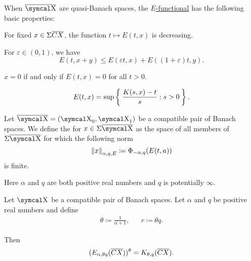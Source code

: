 \begin{proposition}\label{thm:e_functional_properties}
  When \( \Ol{\CX} \) are quasi-Banach spaces, the \hyperref[def:e_functional]{\( E \)-functional} has the following basic properties:

  \begin{PropEnum}
     For fixed \( x \in \Sigma\overline{CX} \), the function \( t \mapsto E(t, x) \) is decreasing.

     For \( \varepsilon \in (0, 1) \), we have
    \begin{equation*}
      E(t, x + y) \leq E(\varepsilon t, x) + E((1 + \varepsilon) t, y).
    \end{equation*}

     \( x = 0 \) if and only if \( E(t, x) = 0 \) for all \( t > 0 \).

    \begin{equation*}
      E(t, x) = \sup \Set{ \frac {K(s, x) - t} s : s > 0 }.
    \end{equation*}
  \end{PropEnum}
\end{proposition}

\begin{definition}\label{def:approximation_space}
  Let \( \Ol{\CX} = (\CX_0, \CX_1) \) be a compatible pair of Banach spaces. We define the  for \( x \in \Sigma\Ol{\CX} \) as the space of all members of \( \Sigma\Ol{\CX} \) for which the following norm
  \begin{equation}\label{eq:def:approximation_space/norm}
    \left\Vert x \right\Vert_{\alpha,q,E} \coloneqq \Phi_{-\alpha,q}(E(t,a))
  \end{equation}
  is finite.

  Here \( \alpha \) and \( q \) are both positive real numbers and \( q \) is potentially \( \infty \).
\end{definition}

\begin{theorem}\label{thm:interpolation_space_and_approximation_space}
  Let \( \CX \) be a compatible pair of Banach spaces. Let \( \alpha \) and \( q \) be positive real numbers and define
  \begin{align*}
    \theta \coloneqq \frac 1 {\alpha + 1},
    &&
    r \coloneqq \theta q.
  \end{align*}

  Then
  \begin{equation*}
    (E_{\alpha,\theta q}(\overline{CX}))^\theta = K_{\theta,q}(\overline{CX}).
  \end{equation*}
\end{theorem}

